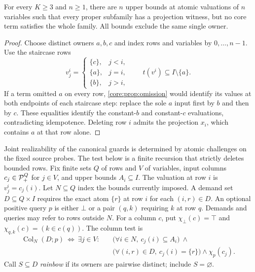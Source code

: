 \begin{theorem}\label{core:thm:negative-budgets}
For every $K\geq3$ and $n\geq1$, there are $n$ upper bounds at atomic
valuations of $n$ variables such that every proper subfamily has a
projection witness, but no core term satisfies the whole family.
All bounds exclude the same single owner.
\end{theorem}
\begin{proof}
Choose distinct owners $a,b,c$ and index rows and variables by
$0,\ldots,n-1$. Use the staircase rows
\[
 v^i_j=\begin{cases}
 \{c\},&j<i,\\
 \{a\},&j=i,\\
 \{b\},&j>i,
 \end{cases}
 \qquad t(v^i)\subseteq I\setminus\{a\}.
\]
If a term omitted $a$ on every row, \cref{core:prop:omission} would
identify its values at both endpoints of each staircase step: replace
the sole $a$ input first by $b$ and then by $c$. These equalities identify
the constant-$b$ and constant-$c$ evaluations, contradicting idempotence.
Deleting row $i$ admits the projection $x_i$, which contains $a$ at that
row alone.
\end{proof}

Joint realizability of the canonical guards is determined by atomic
challenges on the fixed source probes. The test below is a finite recursion
that strictly deletes bounded rows.
Fix finite sets $Q$ of rows and $V$ of variables, input columns
$c_j\in\mathcal P_+^Q$ for $j\in V$, and upper bounds $A_i\subseteq I$.
The valuation at row $i$ is $v^i_j=c_j(i)$.
Let $N\subseteq Q$ index the bounds currently imposed.
A demand set $D\subseteq Q\times I$
requires the exact atom $\{r\}$ at row $i$ for each $(i,r)\in D$.
An optional positive query $p$ is either $\bot$ or a pair $(q,k)$
requiring $k$ at row $q$. Demands and queries may refer to rows outside $N$.
For a column $c$, put $\chi_\bot(c)=\top$ and
$\chi_{q,k}(c)=(k\in c(q))$. The column test is
\[
 \begin{aligned}
 \operatorname{Col}_N(D;p)\ \Longleftrightarrow\ \exists j\in V:\quad
 &\bigl(\forall i\in N,\ c_j(i)\subseteq A_i\bigr)\ \land\\
 &\bigl(\forall(i,r)\in D,\ c_j(i)=\{r\}\bigr)\land\chi_p(c_j).
 \end{aligned}
\]
Call $S\subseteq D$ \emph{rainbow} if its owners are pairwise
distinct; include $S=\varnothing$.

